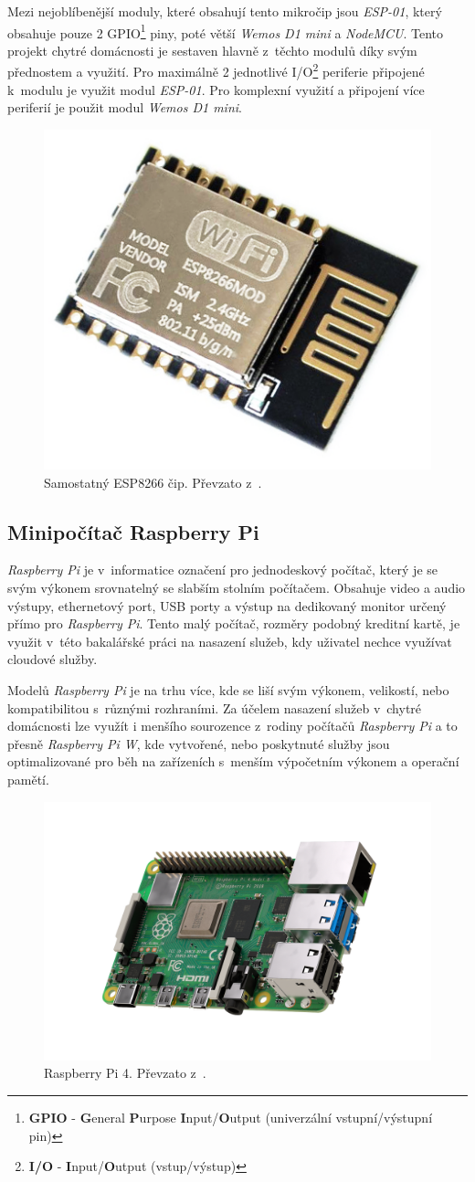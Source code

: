 Mezi nejoblíbenější moduly, které obsahují tento mikročip jsou \emph{ESP-01}, který obsahuje pouze 2 GPIO\footnote{\textbf{GPIO} - \textbf{G}eneral \textbf{P}urpose \textbf{I}nput/\textbf{O}utput (univerzální vstupní/výstupní pin)} piny, poté větší \emph{Wemos D1 mini} a \emph{NodeMCU}.
Tento projekt chytré domácnosti je sestaven hlavně z~těchto modulů díky svým přednostem a využití.
Pro maximálně 2 jednotlivé I/O\footnote{\textbf{I/O} - \textbf{I}nput/\textbf{O}utput (vstup/výstup)} periferie připojené k~modulu je využit modul \emph{ESP-01}.
Pro komplexní využití a připojení více periferií je použit modul \emph{Wemos D1 mini}.

\begin{figure}[hbt]
  \centering
  \includegraphics[width=.2 \linewidth]{obrazky-figures/esp_standalone.png}
  \caption{Samostatný ESP8266 čip. Převzato z~\cite{esp8266logo}.}
  \label{figure:esp8266}
\end{figure}

\subsection*{Minipočítač Raspberry Pi}
\label{terminy:raspberry}

\emph{Raspberry Pi} je v~informatice označení pro jednodeskový počítač, který je se svým výkonem srovnatelný se slabším stolním počítačem.
Obsahuje video a audio výstupy,
ethernetový port, USB porty a výstup na dedikovaný monitor určený přímo pro \emph{Raspberry Pi}.
Tento malý počítač, rozměry podobný kreditní kartě, je využit v~této bakalářské práci na nasazení služeb, kdy uživatel nechce využívat cloudové služby.

Modelů \emph{Raspberry Pi} je na trhu více, kde se liší svým výkonem, velikostí, nebo kompatibilitou s~různými rozhraními.
Za účelem nasazení služeb v~chytré domácnosti lze využít i menšího sourozence z~rodiny počítačů \emph{Raspberry Pi} a to přesně \emph{Raspberry Pi W},
kde vytvořené, nebo poskytnuté služby jsou optimalizované pro běh na zařízeních s~menším výpočetním výkonem a operační pamětí.

\begin{figure}[ht]
  \centering
  \includegraphics[width=.5 \linewidth]{obrazky-figures/raspberry.png}
  \caption{Raspberry Pi 4. Převzato z~\cite{raspberryLogo}.}
\end{figure}

